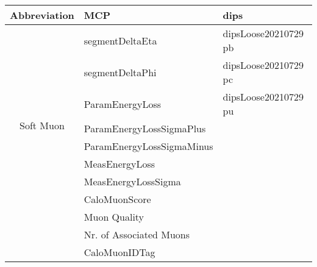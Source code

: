 \begin{table}[]
{\begin{tabular}{c|l|l
      }
      \hline
      Abbreviation                & MCP                              & dips                                      \\
      \hline
      \multirow{9}{*}{Soft Muon}  & segmentDeltaEta                  & dipsLoose20210729 pb                      \\
                                  & segmentDeltaPhi                  & dipsLoose20210729 pc                      \\
                                  & ParamEnergyLoss                  & dipsLoose20210729 pu                      \\
                                  & ParamEnergyLossSigmaPlus         &                                           \\
                                  & ParamEnergyLossSigmaMinus        &                                           \\
      Variables                   & MeasEnergyLoss                   &                                           \\
                                  & MeasEnergyLossSigma              &                                           \\
                                  & CaloMuonScore                    &                                           \\
                                  & Muon Quality                     &                                           \\
                                  & Nr. of Associated Muons          &                                           \\
                                  & CaloMuonIDTag                    &                                           \\
      \hline
    \end{tabular}
  }
\end{table}


